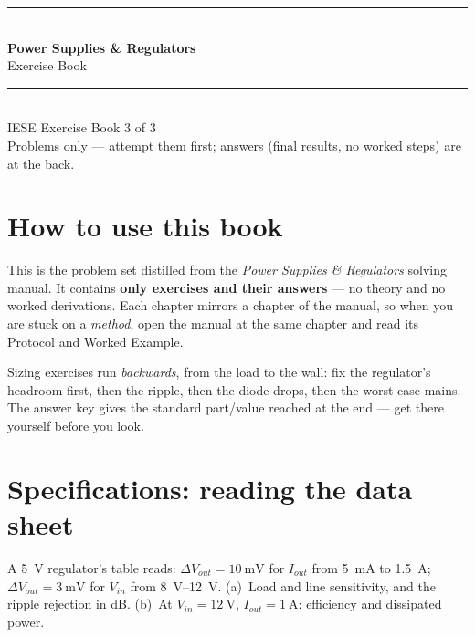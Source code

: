 \documentclass[11pt,a4paper,oneside]{book}
\begin{document}
\frontmatter

\begingroup
\thispagestyle{empty}\centering
\vspace*{2.2cm}
{\color{accent}\rule{\linewidth}{1.4pt}}\\[0.5cm]
{\Huge\bfseries\color{accent} Power Supplies \& Regulators}\\[0.35cm]
{\LARGE Exercise Book}\\[0.4cm]
{\color{accent}\rule{\linewidth}{1.4pt}}\\[1.2cm]
{\large IESE Exercise Book 3 of 3}\\[1.6cm]
{\footnotesize Problems only --- attempt them first; answers (final results, no
worked steps) are at the back.}
\par\vspace*{\fill}
\endgroup
\clearpage

\chapter*{How to use this book}

This is the problem set distilled from the \emph{Power Supplies \& Regulators}
solving manual. It contains \textbf{only exercises and their answers} --- no
theory and no worked derivations. Each chapter mirrors a chapter of the manual,
so when you are stuck on a \emph{method}, open the manual at the same chapter and
read its Protocol and Worked Example.

\begin{keyidea}
Sizing exercises run \emph{backwards}, from the load to the wall: fix the
regulator's headroom first, then the ripple, then the diode drops, then the
worst-case mains. The answer key gives the standard part/value reached at the
end --- get there yourself before you look.
\end{keyidea}

\tableofcontents
\clearpage
\mainmatter

\chapter{Specifications: reading the data sheet}

\begin{exercise}
A \qty{5}{\volt} regulator's table reads: $\Delta V_{out}=\qty{10}{\milli\volt}$
for $I_{out}$ from \qty{5}{\milli\ampere} to \qty{1.5}{\ampere};
$\Delta V_{out}=\qty{3}{\milli\volt}$ for $V_{in}$ from \qtyrange{8}{12}{\volt}.
(a)~Load and line sensitivity, and the ripple rejection in dB.
(b)~At $V_{in}=\qty{12}{\volt}$, $I_{out}=\qty{1}{\ampere}$: efficiency and
dissipated power.
\end{exercise}
\end{document}
